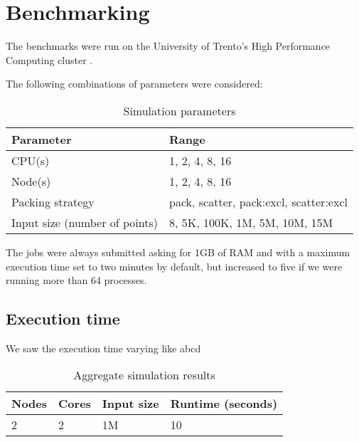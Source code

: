\section{Benchmarking}

The benchmarks were run on the University of Trento's High Performance Computing cluster
.

The following combinations of parameters were considered:

\begin{table}[ht]
    \centering
    \caption{Simulation parameters}
    \begin{tabular}{l|l}
        \hline
        Parameter                     & Range                                    \\
        \hline
        CPU(s)                        & {1, 2, 4, 8, 16}                         \\
        Node(s)                       & {1, 2, 4, 8, 16}                         \\
        Packing strategy              & {pack, scatter, pack:excl, scatter:excl} \\
        Input size (number of points) & {8, 5K, 100K, 1M, 5M, 10M, 15M }         \\
        \hline
    \end{tabular}
\end{table}

The jobs were always submitted asking for 1GB of RAM and with a maximum execution time set to two minutes by default, but increased to five if we were running more than 64 processes.


\subsection{Execution time}

We saw the execution time varying like abcd
\begin{table}[ht]
    \centering
    \caption{Aggregate simulation results}
    \begin{tabular}{l|l|l|l}
        \hline
        Nodes & Cores & Input size & Runtime (seconds) \\
        \hline
        2     & 2     & 1M         & 10                \\
        \hline
    \end{tabular}
\end{table}

